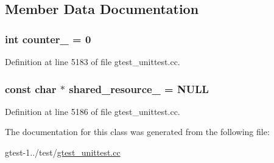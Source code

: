 \subsection{\-Member \-Data \-Documentation}
\hypertarget{classtesting_1_1SetUpTestCaseTest_a3dd655f1f7e3481778d86bd515be83b3}{
\subsubsection[{counter\-\_\-}]{\setlength{\rightskip}{0pt plus 5cm}int {\bf counter\-\_\-} = 0}}\label{d8/d3b/classtesting_1_1SetUpTestCaseTest_a3dd655f1f7e3481778d86bd515be83b3}


\-Definition at line 5183 of file gtest\-\_\-unittest.\-cc.

\hypertarget{classtesting_1_1SetUpTestCaseTest_ad219f67f3c407104d4956f33eb7116be}{
\subsubsection[{shared\-\_\-resource\-\_\-}]{\setlength{\rightskip}{0pt plus 5cm}const char $\ast$ {\bf shared\-\_\-resource\-\_\-} = \-N\-U\-L\-L}}\label{d8/d3b/classtesting_1_1SetUpTestCaseTest_ad219f67f3c407104d4956f33eb7116be}


\-Definition at line 5186 of file gtest\-\_\-unittest.\-cc.



\-The documentation for this class was generated from the following file\-:\begin{DoxyCompactItemize}
\item 
gtest-\/1../test/\hyperlink{gtest__unittest_8cc}{gtest\-\_\-unittest.\-cc}\end{DoxyCompactItemize}
